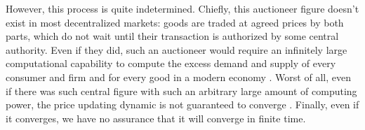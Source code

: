 However, this process is quite indetermined. Chiefly, this auctioneer
figure doesn't exist in most decentralized markets: goods are traded
at agreed prices by both parts, which do not wait until their
transaction is authorized by some central authority. Even if they did,
such an auctioneer would require an infinitely large computational
capability to compute the excess demand and supply of every consumer
and firm and for every good in a modern economy \cite{axtell05,
  Roughgarden10}. Worst of all, even if there was such central figure
with such an arbitrary large amount of computing power, the price
updating dynamic is not guaranteed to
converge \cite{Gintis07}. Finally, even if it converges, we have no
assurance that it will converge in finite time.





\cite{thurner} \cite{Schumpeter39} \cite{savage} \cite{mascolell}

\cite{Tversky74, Kahneman79, Tversky81}

